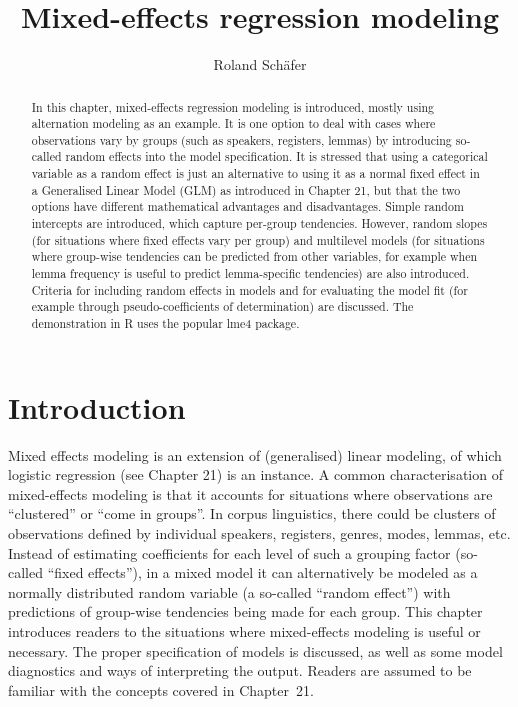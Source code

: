 \documentclass[graybox]{svmult}
\title{Mixed-effects regression modeling}
\author{Roland Schäfer}
\institute{Roland Schäfer \at Deutsche und niederländische Philologie, Freie Universität Berlin \email{roland.schaefer@fu-berlin.de}}
\begin{document}
       

\setcounter{chapter}{21}
\renewcommand*\thesection{\arabic{section}}

\maketitle

\begin{abstract}{In this chapter, mixed-effects regression modeling is introduced, mostly using alternation modeling as an example.
  It is one option to deal with cases where observations vary by groups (such as speakers, registers, lemmas) by introducing so-called random effects into the model specification.
  It is stressed that using a categorical variable as a random effect is just an alternative to using it as a normal fixed effect in a Generalised Linear Model (GLM) as introduced in Chapter 21, but that the two options have different mathematical advantages and disadvantages.
  Simple random intercepts are introduced, which capture per-group tendencies.
  However, random slopes (for situations where fixed effects vary per group) and multilevel models (for situations where group-wise tendencies can be predicted from other variables, for example when lemma frequency is useful to predict lemma-specific tendencies) are also introduced.
  Criteria for including random effects in models and for evaluating the model fit (for example through pseudo-coefficients of determination) are discussed.
The demonstration in R uses the popular lme4 package.}
  \end{abstract}

\section{Introduction}
\label{sec:introduction}

Mixed effects modeling is an extension of (generalised) linear modeling, of which logistic regression (see Chapter 21) is an instance.
A common characterisation of mixed-effects modeling is that it accounts for situations where observations are ``clustered'' or ``come in groups''.
In corpus linguistics, there could be clusters of observations defined by individual speakers, registers, genres, modes, lemmas, etc.
Instead of estimating coefficients for each level of such a grouping factor (so-called ``fixed effects''), in a mixed model it can alternatively be modeled as a normally distributed random variable (a so-called ``random effect'') with predictions of group-wise tendencies being made for each group.
This chapter introduces readers to the situations where mixed-effects modeling is useful or necessary.
The proper specification of models is discussed, as well as some model diagnostics and ways of interpreting the output.
Readers are assumed to be familiar with the concepts covered in Chapter~21.
\end{document}

